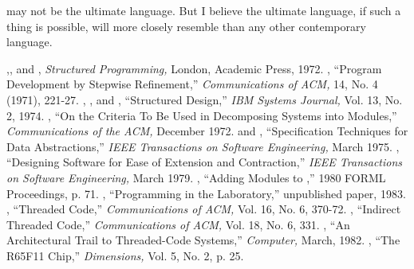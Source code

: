 \Forth{} may not be the ultimate language. But I believe the ultimate
language, if such a thing is possible, will more closely resemble
\Forth{} than any other contemporary language.%


\begin{references}{99}
 ,, and ,
\emph{Structured Programming,} London, Academic Press, 1972.
 , ``Program Development by Stepwise
Refinement,'' \emph{Communications of ACM,} 14, No. 4 (1971), 221-27.
 , , and ,
``Structured Design,'' \emph{IBM Systems Journal,} Vol. 13, No. 2, 1974.
 , ``On the Criteria To Be Used in
Decomposing Systems into Modules,'' \emph{Communications of the ACM,}
December 1972.
  and ,
``Specification Techniques for Data Abstractions,'' \emph{IEEE
Transactions on Software Engineering,} March 1975.
 , ``Designing Software for Ease of
Extension and Contraction,'' \emph{IEEE Transactions on Software
Engineering,} March 1979.
 , ``Adding Modules to \Forth{},''
1980 FORML Proceedings, p. 71.
 , ``Programming in the Laboratory,''
  unpublished paper, 1983.
 , ``Threaded Code,'' \emph{Communications
of ACM,} Vol. 16, No. 6, 370-72.
 , ``Indirect Threaded Code,''
\emph{Communications of ACM,} Vol. 18, No. 6, 331.
 , ``An Architectural Trail to
Threaded-Code Systems,'' \emph{Computer,} March, 1982.
 , ``The R65F11 \Forth{} Chip,'' \emph{\Forth{}
Dimensions,} Vol. 5, No. 2, p. 25.
\end{references}

